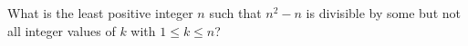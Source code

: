 What is the least positive integer $n$ such that $n^2-n$ is divisible by some but not all integer values of $k$ with $1\le k\le n$?
